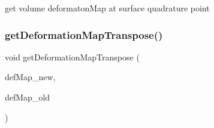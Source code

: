 get volume deformaton\+Map at surface quadrature point \mbox{\label{group___evaluation_functions_gad4003712a2346a79e13bdbfcad4d1e1c}} 
\subsubsection{\texorpdfstring{get\+Deformation\+Map\+Transpose()}{getDeformationMapTranspose()}}
{\footnotesize\ttfamily void get\+Deformation\+Map\+Transpose (\begin{DoxyParamCaption}\item[{\mbox{\hyperlink{structdeformation_map}{deformation\+Map}}$<$ T, dim $>$ \&}]{def\+Map\+\_\+new,  }\item[{\mbox{\hyperlink{structdeformation_map}{deformation\+Map}}$<$ T, dim $>$ \&}]{def\+Map\+\_\+old }\end{DoxyParamCaption})}

